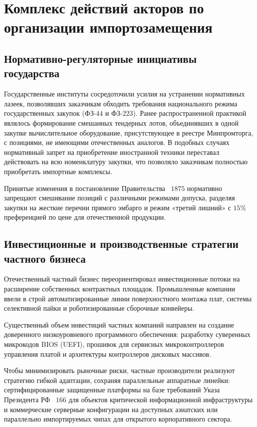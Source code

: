 \documentclass[12pt,a4paper]{article}
\begin{document}
\section{Комплекс действий акторов по организации импортозамещения}

\subsection{Нормативно-регуляторные инициативы государства}

Государственные институты сосредоточили усилия на устранении 
нормативных лазеек, позволявших заказчикам обходить требования 
национального режима государственных закупок (ФЗ-$44$ и ФЗ-$223$). 
Ранее распространенной практикой являлось формирование смешанных 
тендерных лотов, объединявших в одной закупке вычислительное 
оборудование, присутствующее в реестре Минпромторга, с позициями, 
не имеющими отечественных аналогов. В подобных случаях нормативный 
запрет на приобретение иностранной техники переставал действовать 
на всю номенклатуру закупки, что позволяло заказчикам полностью 
приобретать импортные комплексы.

Принятые изменения в постановление Правительства \textnumero~$1875$ 
нормативно запрещают смешивание позиций с различными режимами допуска, 
разделяя закупки на жесткие перечни прямого эмбарго и режим «третий 
лишний» с $15\%$ преференцией по цене для отечественной 
продукции.

\subsection{Инвестиционные и производственные стратегии частного бизнеса}

Отечественный частный бизнес переориентировал 
инвестиционные потоки на расширение собственных контрактных 
площадок. Промышленные компании ввели в строй автоматизированные 
линии поверхностного монтажа плат, системы селективной пайки и 
роботизированные сборочные конвейеры.

Существенный объем инвестиций частных компаний направлен на создание 
доверенного низкоуровневого программного обеспечения: разработку 
суверенных микрокодов BIOS (UEFI), прошивок для сервисных 
микроконтроллеров управления платой и архитектуры контроллеров 
дисковых массивов. 

Чтобы минимизировать рыночные риски, частные производители 
реализуют стратегию гибкой адаптации, сохраняя параллельные 
аппаратные линейки: сертифицированные защищенные платформы на 
базе требований Указа Президента РФ \textnumero~$166$ для объектов 
критической информационной инфраструктуры и коммерческие серверные 
конфигурации на доступных азиатских или параллельно импортируемых 
чипах для открытого корпоративного сектора.
\end{document}
